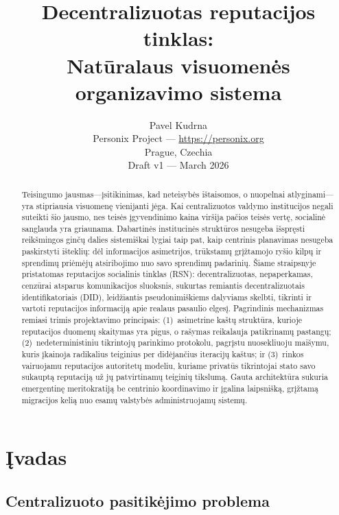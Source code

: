 \documentclass[11pt,a4paper,twocolumn]{article}
\title{\textbf{Decentralizuotas reputacijos tinklas:\\Natūralaus visuomenės organizavimo sistema}}
\author{Pavel Kudrna\\Personix Project --- \url{https://personix.org}\\Prague, Czechia\\Draft v1 --- March 2026}
\date{}
\begin{document}
\maketitle

\begin{abstract}
Teisingumo jausmas---įsitikinimas, kad neteisybės ištaisomos, o nuopelnai atlyginami---yra stipriausia visuomenę vienijanti jėga. Kai centralizuotos valdymo institucijos negali suteikti šio jausmo, nes teisės įgyvendinimo kaina viršija pačios teisės vertę, socialinė sanglauda yra griaunama. Dabartinės institucinės struktūros nesugeba išspręsti reikšmingos ginčų dalies sistemiškai lygiai taip pat, kaip centrinis planavimas nesugeba paskirstyti išteklių: dėl informacijos asimetrijos, trūkstamų grįžtamojo ryšio kilpų ir sprendimų priėmėjų atsiribojimo nuo savo sprendimų padarinių. Šiame straipsnyje pristatomas reputacijos socialinis tinklas (RSN): decentralizuotas, nepaperkamas, cenzūrai atsparus komunikacijos sluoksnis, sukurtas remiantis decentralizuotais identifikatoriais (DID), leidžiantis pseudonimiškiems dalyviams skelbti, tikrinti ir vartoti reputacijos informaciją apie realaus pasaulio elgesį. Pagrindinis mechanizmas remiasi trimis projektavimo principais: (1)~asimetrine kaštų struktūra, kurioje reputacijos duomenų skaitymas yra pigus, o rašymas reikalauja patikrinamų pastangų; (2)~nedeterministiniu tikrintojų parinkimo protokolu, pagrįstu nuosekliuoju maišymu, kuris įkainoja radikalius teiginius per didėjančius iteracijų kaštus; ir (3)~rinkos vairuojamu reputacijos autoritetų modeliu, kuriame privatūs tikrintojai stato savo sukauptą reputaciją už jų patvirtinamų teiginių tikslumą. Gauta architektūra sukuria emergentinę meritokratiją be centrinio koordinavimo ir įgalina laipsnišką, grįžtamą migracijos kelią nuo esamų valstybės administruojamų sistemų.
\end{abstract}

\section{Įvadas}

\subsection{Centralizuoto pasitikėjimo problema}
\end{document}
